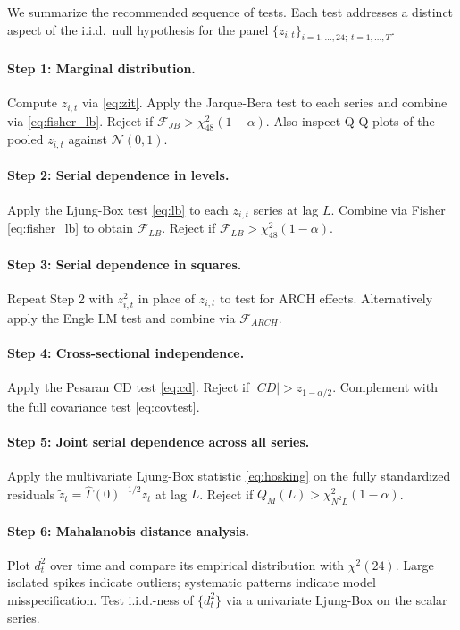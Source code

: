 \documentclass[12pt]{article}
\begin{document}
We summarize the recommended sequence of tests. Each test addresses a distinct
aspect of the i.i.d.\ null hypothesis for the panel $\{z_{i,t}\}_{i=1,\ldots,24;\;t=1,\ldots,T}$.

\paragraph{Step 1: Marginal distribution.}
Compute $z_{i,t}$ via \eqref{eq:zit}. Apply the Jarque-Bera test to each series and
combine via \eqref{eq:fisher_lb}. Reject if $\mathcal{F}_{JB} > \chi^2_{48}(1-\alpha)$.
Also inspect Q-Q plots of the pooled $z_{i,t}$ against $\mathcal{N}(0,1)$.

\paragraph{Step 2: Serial dependence in levels.}
Apply the Ljung-Box test \eqref{eq:lb} to each $z_{i,t}$ series at lag $L$. Combine
via Fisher \eqref{eq:fisher_lb} to obtain $\mathcal{F}_{LB}$. Reject if
$\mathcal{F}_{LB} > \chi^2_{48}(1-\alpha)$.

\paragraph{Step 3: Serial dependence in squares.}
Repeat Step 2 with $z_{i,t}^2$ in place of $z_{i,t}$ to test for ARCH effects.
Alternatively apply the Engle LM test and combine via $\mathcal{F}_{ARCH}$.

\paragraph{Step 4: Cross-sectional independence.}
Apply the Pesaran CD test \eqref{eq:cd}. Reject if $|CD| > z_{1-\alpha/2}$.
Complement with the full covariance test \eqref{eq:covtest}.

\paragraph{Step 5: Joint serial dependence across all series.}
Apply the multivariate Ljung-Box statistic \eqref{eq:hosking} on the fully
standardized residuals $\tilde{z}_t = \hat{\Gamma}(0)^{-1/2} z_t$ at lag $L$.
Reject if $Q_M(L) > \chi^2_{N^2 L}(1-\alpha)$.

\paragraph{Step 6: Mahalanobis distance analysis.}
Plot $d_t^2$ over time and compare its empirical distribution with $\chi^2(24)$.
Large isolated spikes indicate outliers; systematic patterns indicate model
misspecification. Test i.i.d.-ness of $\{d_t^2\}$ via a univariate Ljung-Box on
the scalar series.
\end{document}
